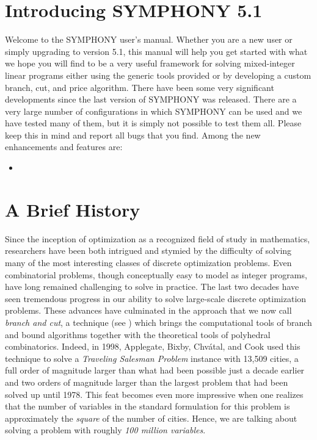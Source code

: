 \section{Introducing SYMPHONY 5.1}
\label{whats-new}

Welcome to the SYMPHONY user's manual. Whether you are a new user or simply
upgrading to version 5.1, this manual will help you get started with what we
hope you will find to be a very useful framework for solving mixed-integer
linear programs either using the generic tools provided or by developing a
custom branch, cut, and price algorithm. There have been some very significant
developments since the last version of SYMPHONY was released. There are a very
large number of configurations in which SYMPHONY can be used and we have
tested many of them, but it is simply not possible to test them all. Please
keep this in mind and report all bugs that you find. Among the new
enhancements and features are:

\begin{itemize}

\item 

\end{itemize}

\section{A Brief History}
\label{history}

Since the inception of optimization as a recognized field of study in
mathematics, researchers have been both intrigued and stymied by the
difficulty of solving many of the most interesting classes of discrete
optimization problems. Even combinatorial problems, though
conceptually easy to model as integer programs, have long remained
challenging to solve in practice. The last two decades have seen
tremendous progress in our ability to solve large-scale discrete
optimization problems. These advances have culminated in the approach
that we now call {\it branch and cut}, a technique (see \cite{Grotschel84cut,padb:branc,hoff:LP}) which brings the computational tools of branch and bound
algorithms together with the theoretical tools of polyhedral
combinatorics. Indeed, in 1998, Applegate, Bixby, Chv\'atal, and Cook
used this technique to solve a {\em Traveling Salesman Problem}
instance with 13,509 cities, a full order of magnitude larger than
what had been possible just a decade earlier \cite{concorde} and two
orders of magnitude larger than the largest problem that had been
solved up until 1978. This feat becomes even more impressive when one
realizes that the number of variables in the standard formulation for
this problem is approximately the {\em square} of the number of
cities. Hence, we are talking about solving a problem with roughly
{\em 100 million variables}.

